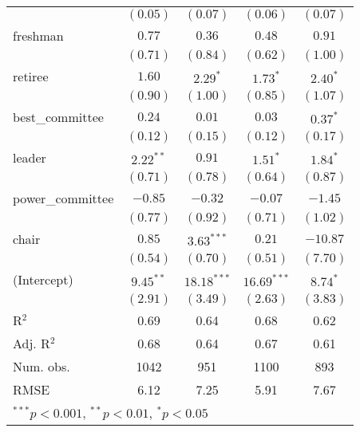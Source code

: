 \documentclass[12pt]{article}
\begin{document}
\begin{table}[H]
\begin{center}
\begin{tabular}{l c c c c }
			& $(0.05)$     & $(0.07)$      & $(0.06)$      & $(0.07)$     \\
			freshman               & $0.77$       & $0.36$        & $0.48$        & $0.91$       \\
			& $(0.71)$     & $(0.84)$      & $(0.62)$      & $(1.00)$     \\
			retiree                & $1.60$       & $2.29^{*}$    & $1.73^{*}$    & $2.40^{*}$   \\
			& $(0.90)$     & $(1.00)$      & $(0.85)$      & $(1.07)$     \\
			best\_committee        & $0.24$       & $0.01$        & $0.03$        & $0.37^{*}$   \\
			& $(0.12)$     & $(0.15)$      & $(0.12)$      & $(0.17)$     \\
			leader                 & $2.22^{**}$  & $0.91$        & $1.51^{*}$    & $1.84^{*}$   \\
			& $(0.71)$     & $(0.78)$      & $(0.64)$      & $(0.87)$     \\
			power\_committee       & $-0.85$      & $-0.32$       & $-0.07$       & $-1.45$      \\
			& $(0.77)$     & $(0.92)$      & $(0.71)$      & $(1.02)$     \\
			chair                  & $0.85$       & $3.63^{***}$  & $0.21$        & $-10.87$     \\
			& $(0.54)$     & $(0.70)$      & $(0.51)$      & $(7.70)$     \\
			(Intercept)            & $9.45^{**}$  & $18.18^{***}$ & $16.69^{***}$ & $8.74^{*}$   \\
			& $(2.91)$     & $(3.49)$      & $(2.63)$      & $(3.83)$     \\
			\hline
			R$^2$                  & 0.69         & 0.64          & 0.68          & 0.62         \\
			Adj. R$^2$             & 0.68         & 0.64          & 0.67          & 0.61         \\
			Num. obs.              & 1042         & 951           & 1100          & 893          \\
			RMSE                   & 6.12         & 7.25          & 5.91          & 7.67         \\
			\hline
			\multicolumn{5}{l}{\scriptsize{$^{***}p<0.001$, $^{**}p<0.01$, $^*p<0.05$}}
		\end{tabular}
	\end{center}
\end{table}
\end{document}
